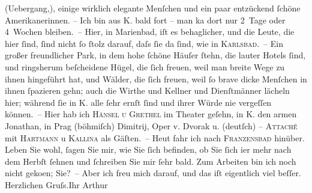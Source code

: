 \begin{ledgroupsized}[t]{13cm}
               (Uebergang,), einige wirklich elegante Menſchen und ein paar entzückend ſchöne
               Amerikanerinnen. – Ich bin aus \textsc{K}. {\pb}bald fort – man ka{\geminationn}
               dort nur 2 Tage oder 4 Wochen bleiben. – Hier, in Marienbad, iſt es behaglicher, und die Leute, die hier ſind, ſind nicht ſo
               ſtolz darauf, daſs ſie da ſind, wie in \textsc{Karlsbad}. – Ein großer freundlicher Park, in dem hohe ſchöne Häuſer ſtehn, die lauter
               Hotels ſind, und ringsherum beſcheidene Hügel, die ſich freuen, weil man breite Wege
               zu ihnen hingeführt hat, und Wälder, die ſich freuen, weil ſo brave dicke Menſchen in
               ihnen ſpazieren gehn; auch die Wirthe und Kellner {\pb}und
               Dienſtmänner lächeln hier; während ſie in \textsc{K.} alle ſehr ernſt ſind und ihrer Würde nie vergeſſen können. – Hier hab ich \textsc{Hänsel u Grethel} im Theater geſehn, in \textsc{K.} den armen Jonathan, in Prag (böhmiſch) Dimitrij, Oper v. Dvorak u. (deutſch) – \textsc{Attaché} mit \textsc{Hartmann} u \textsc{Kallina} als Gäſten. –\pend
           \pstart
           Heut fahr ich nach \textsc{Franzensbad} hinüber.\pend
           \pstart
           Leben Sie wohl, ſagen Sie mir, wie Sie ſich befinden, ob Sie ſich i{\geminationm}er mehr nach dem Herbſt ſehnen und ſchreiben Sie mir
               ſehr bald. Zum Arbeiten bin ich noch {\pb}nicht geko{\geminationm}en; Sie? – Aber ich freu mich darauf, und das iſt
               eigentlich viel beſſer.\pend
           \pstart Herzlichen Gruſs.\hspace*{2em}Ihr \spacefill\mbox{Arthur}\pend{}
         

\end{ledgroupsized}
